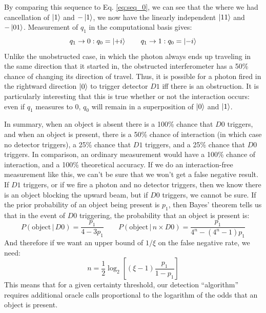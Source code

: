 \documentclass{article}
\newcommand{\Prob}[2]{P\left(#1\,|\,#2\right)}
\begin{document}
By comparing this sequence to Eq. \ref{eq:seq_0}, we can see that the where we had cancellation of $\ket 1$ and $-\ket 1$, we now have the linearly independent $\ket{11}$ and $-\ket{01}$. Measurement of $q_1$ in the computational basis gives:
$$q_1 \to 0: q_0 = \ket{+i} \qquad q_1 \to 1: q_0 = \ket{-i}$$
Unlike the unobstructed case, in which the photon always ends up traveling in the same direction that it started in, the obstructed interferometer has a 50\% chance of changing its direction of travel. Thus, it is possible for a photon fired in the rightward direction $\ket 0$ to trigger detector $D1$ iff there is an obstruction. It is particularly interesting that this is true whether or not the interaction occurs: even if $q_1$ measures to 0, $q_0$ will remain in a superposition of $\ket 0$ and $\ket 1$.

In summary, when an object is absent there is a 100\% chance that $D0$ triggers, and when an object is present, there is a 50\% chance of interaction (in which case no detector triggers), a 25\% chance that $D1$ triggers, and a 25\% chance that $D0$ triggers. In comparison, an ordinary measurement would have a 100\% chance of interaction, and a 100\% theoretical accuracy. If we do an interaction-free measurement like this, we can't be sure that we won't get a false negative result. If $D1$ triggers, or if we fire a photon and no detector triggers, then we know there is an object blocking the upward beam, but if $D0$ triggers, we cannot be sure. If the prior probability of an object being present is $p_1$, then Bayes' theorem tells us that in the event of $D0$ triggering, the probability that an object is present is:
$$\Prob{\text{object}}{D0} = \frac{p_1}{4 - 3 p_1} \qquad \Prob{\text{object}}{n \times D0} = \frac{p_1}{4^n - (4^n - 1) p_1}$$
And therefore if we want an upper bound of $1/\xi$ on the false negative rate, we need:
$$n = \frac{1}{2} \log_2 \left[ (\xi - 1) \frac{p_1}{1 - p_1}\right]$$
This means that for a given certainty threshold, our detection ``algorithm'' requires additional oracle calls proportional to the logarithm of the odds that an object is present.
\end{document}
